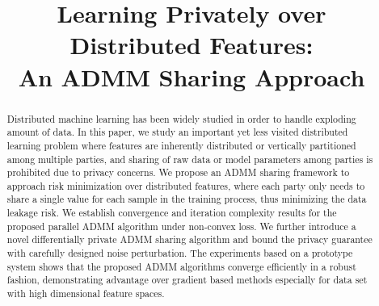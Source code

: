 \documentclass[letterpaper]{article} %
\title{Learning Privately over Distributed Features:\\An ADMM Sharing Approach}
\begin{document}
\maketitle

\begin{abstract}
Distributed machine learning has been widely studied in order to handle exploding amount of data.
In this paper, we study an important yet less visited distributed learning problem where features are inherently distributed or vertically partitioned among multiple parties, and sharing of raw data or model parameters among parties is prohibited due to privacy concerns.
We propose an ADMM sharing framework to approach risk minimization over distributed features, where each party only needs to share a single value for each sample in the training process, thus minimizing the data leakage risk.
We establish convergence and iteration complexity results for the proposed parallel ADMM algorithm under non-convex loss. We further introduce a novel differentially private ADMM sharing algorithm and bound the privacy guarantee with carefully designed noise perturbation. The experiments based on a prototype system shows that the proposed ADMM algorithms converge efficiently in a robust fashion, demonstrating advantage over gradient based methods especially for data set with high dimensional feature spaces.
\end{abstract}











\newpage
\clearpage
\onecolumn

\end{document}
